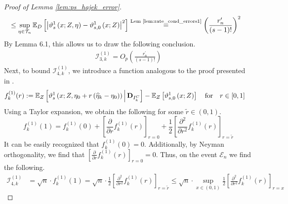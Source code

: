 \begin{proof}[Proof of Lemma \ref{lem:ps_hajek_error}]
\begin{equation}
\begin{aligned}
            & \leq \sup_{\eta \in \mathcal{T}_{n}} 
             \mathbb{E}_{D}\left[\left|\vartheta_{s}^{1}\left(x; Z, \eta\right) - \vartheta_{s,0}^{1}\left(x; Z\right)\right|^{2}\right]
             \overset{\text{Lem \ref{lem:rate_cond_errors1}}}{=} \left(\frac{r_{n}^{\prime}}{(s-1)!}\right)^{2}
        \end{aligned}
    \end{equation}
    By \citet{chernozhukov_doubledebiased_2018} Lemma 6.1, this allows us to draw the following conclusion.
    \begin{equation}
        \begin{aligned}
            \mathcal{I}_{3,k}^{(1)} = O_{p}\left(\frac{r_{n}^{\prime}}{(s-1)!}\right)
        \end{aligned}
    \end{equation}  
    Next, to bound $\mathcal{I}_{4,k}^{(1)}$, we introduce a function analogous to the proof presented in \citet{chernozhukov_doubledebiased_2018}.
    \begin{equation}
        \begin{aligned}
            f_{k}^{(1)}(r) 
            & := \mathbb{E}_{Z}\left[\vartheta_{s}^{1}\left(x; Z, \eta_{0} + r \left(\widehat{\eta}_{k} - \eta_{0}\right)\right) \, \middle| \, \mathbf{D}_{I_{k}^{C}}\right] - \mathbb{E}_{Z}\left[\vartheta_{s,0}^{1}\left(x; Z\right) \right] 
            \quad \text{for} \quad r \in [0,1]
        \end{aligned}
    \end{equation}
    Using a Taylor expansion, we obtain the following for some $\tilde{r} \in (0,1)$.
    \begin{equation}
        f_{k}^{(1)}(1)
        = f_{k}^{(1)}(0) + \left[\frac{\partial}{\partial r}f_{k}^{(1)}(r)\right]_{r = 0} + \frac{1}{2}\left[\frac{\partial^{2}}{\partial r^{2}}f_{k}^{(1)}(r)\right]_{r = \tilde{r}}
    \end{equation}
    It can be easily recognized that $f_{k}^{(1)}(0) = 0$.
    Additionally, by Neyman orthogonality, we find that $\left[\frac{\partial}{\partial r}f_{k}^{(1)}(r)\right]_{r = 0} = 0$.
    Thus, on the event $\mathcal{E}_{n}$ we find the following.
    \begin{equation}
        \begin{aligned}
            \mathcal{I}_{4,k}^{(1)}
            & = \sqrt{n} \cdot f_{k}^{(1)}(1)
            = \sqrt{n} \cdot \frac{1}{2}\left[\frac{\partial^{2}}{\partial r^{2}}f_{k}^{(1)}(r)\right]_{r = \tilde{r}}
            \leq \sqrt{n} \cdot \sup_{x \in (0,1)} \frac{1}{2}\left[\frac{\partial^{2}}{\partial r^{2}}f_{k}^{(1)}(r)\right]_{r = x}

\end{aligned}
\end{equation}
\end{proof}
